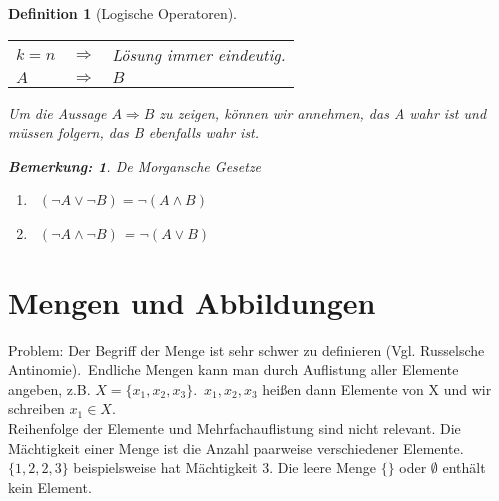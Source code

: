 \documentclass{report}
\newcommand{\IN}[1]{\index{#1|BH}}
\theoremstyle{customrem}
\newtheorem*{bem}{Bemerkung:}
\theoremstyle{customdef}
\newtheorem{definition}{Definition}[chapter]
\begin{document}
\begin{definition}[Logische Operatoren]
\begin{center}
			\begin{tabular}{l c l}
				$k = n$ & $\Rightarrow$ & Lösung immer eindeutig.\\
				$A$ & $\Rightarrow$ &  $B$\\
			\end{tabular}
		\end{center}
		Um die Aussage $A \Rightarrow B$ zu zeigen, können wir annehmen, das A wahr ist und müssen folgern, das B ebenfalls wahr ist.\\
		\begin{bem} De Morgansche Gesetze
			\begin{enumerate}
				\item\ $(\neg A \lor \neg B) = \neg (A \land B)$
				\item\ $(\neg A \land \neg B)$ = $\neg (A \lor B)$
			\end{enumerate}
		\end{bem}
	\end{definition}


\section{Mengen und Abbildungen}
	\IN{Menge}
	Problem: Der Begriff der Menge ist sehr schwer zu definieren (Vgl. Russelsche Antinomie).\
	Endliche Mengen kann man durch Auflistung aller Elemente angeben, z.B. $X = \{x_1, x_2, x_3\}$.\ $x_1, x_2, x_3$ heißen dann Elemente von X und wir schreiben $x_1 \in X$.\\
	Reihenfolge der Elemente und Mehrfachauflistung sind nicht relevant. Die Mächtigkeit einer Menge ist die Anzahl paarweise verschiedener Elemente. $\{1, 2, 2, 3\}$ beispielsweise hat Mächtigkeit $3$.
	Die leere Menge $\{\}$ oder $\emptyset$ enthält kein Element.
\end{document}
